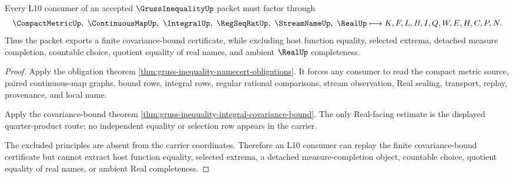 \begin{theorem}
\label{thm:gruss-inequality-l10-nonescape}
Every L10 consumer of an accepted $\GrussInequalityUp$ packet must factor through
$$
\CompactMetricUp,\ \ContinuousMapUp,\ \IntegralUp,\ \RegSeqRatUp,\ \StreamNameUp,\ \RealUp
\longmapsto
K,F,L,B,I,Q,W,E,H,C,P,N .
$$
Thus the packet exports a finite covariance-bound certificate, while excluding host function equality, selected extrema, detached measure completion, countable choice, quotient equality of real names, and ambient $\RealUp$ completeness.
\end{theorem}
\begin{proof}
Apply the obligation theorem \autoref{thm:gruss-inequality-namecert-obligations}. It forces any consumer to read the compact metric source, paired continuous-map graphs, bound rows, integral rows, regular rational comparisons, stream observation, Real sealing, transport, replay, provenance, and local name.

Apply the covariance-bound theorem \autoref{thm:gruss-inequality-integral-covariance-bound}. The only Real-facing estimate is the displayed quarter-product route; no independent equality or selection row appears in the carrier.

The excluded principles are absent from the carrier coordinates. Therefore an L10 consumer can replay the finite covariance-bound certificate but cannot extract host function equality, selected extrema, a detached measure-completion object, countable choice, quotient equality of real names, or ambient Real completeness.
\end{proof}




